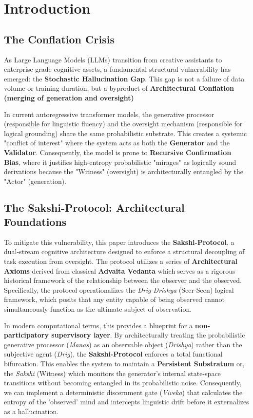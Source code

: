 \documentclass[12pt,a4paper]{article}
\begin{document}
\section{Introduction}
\subsection{The Conflation Crisis}
As Large Language Models (LLMs) transition from creative assistants to enterprise-grade cognitive assets, a fundamental structural vulnerability has emerged: the \textbf{Stochastic Hallucination Gap}. This gap is not a failure of data volume or training duration, but a byproduct of \textbf{Architectural Conflation (merging of generation and oversight)}

In current autoregressive transformer models, the generative processor (responsible for linguistic fluency) and the oversight mechanism (responsible for logical grounding) share the same probabilistic substrate. This creates a systemic "conflict of interest" where the system acts as both the \textbf{Generator} and the \textbf{Validator}. Consequently, the model is prone to \textbf{Recursive Confirmation Bias}, where it justifies high-entropy probabilistic "mirages" as logically sound derivations because the "Witness" (oversight) is architecturally entangled by the "Actor" (generation).

\subsection{The Sakshi-Protocol: Architectural Foundations}
To mitigate this vulnerability, this paper introduces the \textbf{Sakshi-Protocol}, a dual-stream cognitive architecture designed to enforce a structural decoupling of task execution from oversight. The protocol utilizes a series of \textbf{Architectural Axioms} derived from classical \textbf{Advaita Vedanta} which serves as a rigorous historical framework of the relationship between the observer and the observed. Specifically, the protocol operationalizes the \textit{Drig-Drishya} (Seer-Seen) logical framework, which posits that any entity capable of being observed cannot simultaneously function as the ultimate subject of observation.

In modern computational terms, this provides a blueprint for a \textbf{non-participatory supervisory layer}. By architecturally treating the probabilistic generative processor (\textit{Manas}) as an observable object (\textit{Drishya}) rather than the subjective agent (\textit{Drig}), the \textbf{Sakshi-Protocol} enforces a total functional bifurcation. This enables the system to maintain a \textbf{Persistent Substratum} or, the \textit{Sakshi} (Witness) which monitors the generator's internal state-space transitions without becoming entangled in its probabilistic noise. Consequently, we can implement a deterministic discernment gate (\textit{Viveka}) that calculates the entropy of the 'observed' mind and intercepts linguistic drift before it externalizes as a hallucination.
\end{document}
